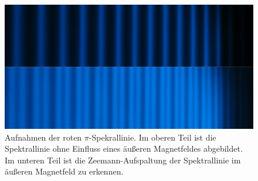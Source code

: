 \FloatBarrier
\begin{figure}[!h]
\centering
\includegraphics[scale=0.1]{../Grafiken/5-I0_t8_pi_6-I17_t8_pi.jpg}
\caption{Aufnahmen der roten $\pi$-Spekrallinie. Im oberen Teil ist die
        Spektrallinie ohne Einfluss eines äußeren Magnetfeldes abgebildet.
        Im unteren Teil ist die Zeemann-Aufspaltung der Spektrallinie
        im äußeren Magnetfeld zu erkennen.\label{fig:5-i0_t8_pi_6-i17_t8_pi}}
\end{figure}
\FloatBarrier
